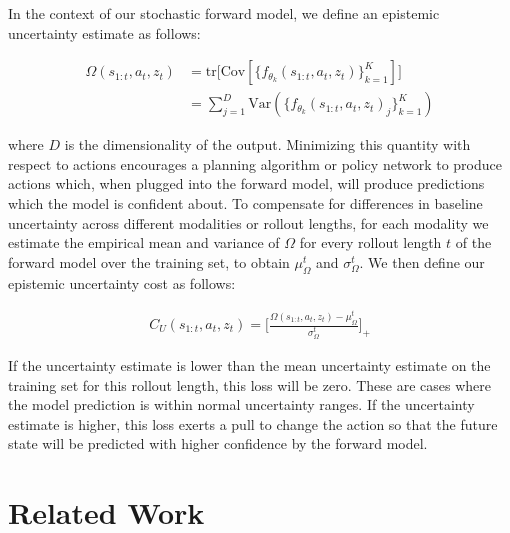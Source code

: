\documentclass{article} %
\begin{document}
    In the context of our stochastic forward model, we define an epistemic uncertainty estimate as follows:

    \begin{align*}
      \Omega(s_{1:t}, a_t, z_t) &= \mbox{tr} \Big[ \mbox{Cov} [\{ f_{\theta_k}(s_{1:t}, a_t, z_t) \}_{k=1}^K] \Big] \\
      &= \sum_{j=1}^D \mbox{Var}(\{ f_{\theta_k}(s_{1:t}, a_t, z_t)_j \}_{k=1}^K)
    \end{align*}

    where $D$ is the dimensionality of the output. Minimizing this quantity with respect to actions encourages a planning algorithm or policy network to produce actions which, when plugged into the forward model, will produce predictions which the model is confident about.
    To compensate for differences in baseline uncertainty across different modalities or rollout lengths, for each modality we estimate the empirical mean and variance of $\Omega$ for every rollout length $t$ of the forward model over the training set, to obtain $\mu_{\Omega}^t$ and $\sigma_{\Omega}^t$. We then define our epistemic uncertainty cost as follows:

    \begin{align}
      C_U(s_{1:t}, a_t, z_t) = \Big [ \frac{\Omega(s_{1:t}, a_t, z_t) - \mu_\Omega^t}{\sigma_\Omega^t} \Big]_+
    \end{align}

    If the uncertainty estimate is lower than the mean uncertainty estimate on the training set for this rollout length, this loss will be zero.
    These are cases where the model prediction is within normal uncertainty ranges. If the uncertainty estimate is higher, this loss exerts a pull to change the action so that the future state will be predicted with higher confidence by the forward model.



\section{Related Work}
\end{document}
